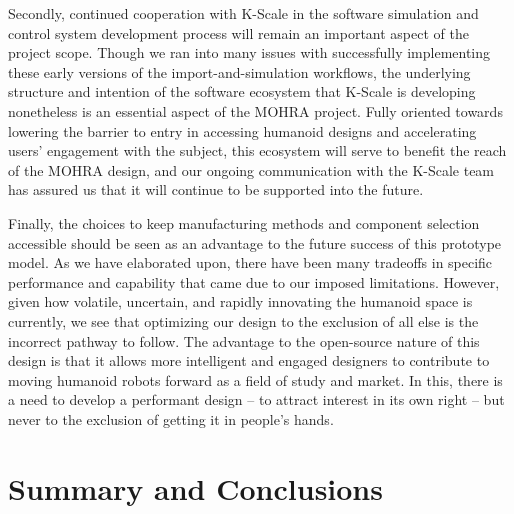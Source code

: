 \documentclass{article}
\begin{document}
Secondly, continued cooperation with K-Scale in the software simulation and control system development process will remain an important aspect of the project scope. Though we ran into many issues with successfully implementing these early versions of the import-and-simulation workflows, the underlying structure and intention of the software ecosystem that K-Scale is developing nonetheless is an essential aspect of the MOHRA project. Fully oriented towards lowering the barrier to entry in accessing humanoid designs and accelerating users' engagement with the subject, this ecosystem will serve to benefit the reach of the MOHRA design, and our ongoing communication with the K-Scale team has assured us that it will continue to be supported into the future.

Finally, the choices to keep manufacturing methods and component selection accessible should be seen as an advantage to the future success of this prototype model. As we have elaborated upon, there have been many tradeoffs in specific performance and capability that came due to our imposed limitations. However, given how volatile, uncertain, and rapidly innovating the humanoid space is currently, we see that optimizing our design to the exclusion of all else is the incorrect pathway to follow. The advantage to the open-source nature of this design is that it allows more intelligent and engaged designers to contribute to moving humanoid robots forward as a field of study and market. In this, there is a need to develop a performant design -- to attract interest in its own right -- but never to the exclusion of getting it in people's hands.

\section{Summary and Conclusions}
\end{document}
